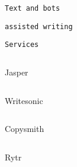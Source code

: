        

       
       
        \protect\hypertarget{ID_250828813}{}{}

\begin{verbatim}
Text and bots
\end{verbatim}

         
         
          \protect\hypertarget{ID_1763993792}{}{}

\begin{verbatim}
assisted writing
\end{verbatim}

           
           
            \protect\hypertarget{ID_1178530422}{}{}

\begin{verbatim}
Services
\end{verbatim}

             
             
              \protect\hypertarget{ID_1550980736}{}{}

\begin{verbatim}
\end{verbatim}

              Jasper
             

             
             
              \protect\hypertarget{ID_156466968}{}{}

\begin{verbatim}
\end{verbatim}

              Writesonic
             

             
             
              \protect\hypertarget{ID_1144432819}{}{}

\begin{verbatim}
\end{verbatim}

              Copysmith
             

             
             
              \protect\hypertarget{ID_977891728}{}{}

\begin{verbatim}
\end{verbatim}

              Rytr
             

